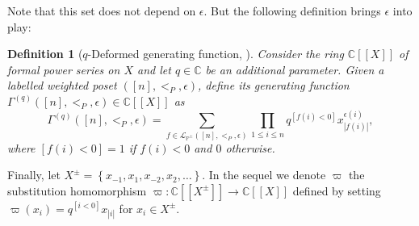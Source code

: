 \documentclass[revision]{FPSAC2024}
\newtheorem{defn}{Definition}
\newcommand{\CC}{\mathbb{C}} %
\newcommand{\PP}{\mathbb{P}} %
\begin{document}
Note that this set does not depend on $\epsilon$.
But the following definition brings $\epsilon$ into play:
\begin{defn}[$q$-Deformed generating function, \cite{GriVas22}]
Consider the ring $\CC \left[\left[ X \right]\right]$ of formal power series on $X$ and let $q \in \CC$ be an additional parameter. Given a labelled weighted poset $([n], <_P, \epsilon)$, define its generating function $\Gamma^{(q)}([n], <_P, \epsilon) \in \CC \left[\left[ X \right]\right]$ as
\begin{equation*}
\label{eq : weightGamma}
\Gamma^{(q)}([n], <_P, \epsilon) = \sum_{f\in\mathcal{L}_{\PP^\pm}([n],<_{P}, \epsilon)} \prod_{1\leq i\leq n}q^{[f(i)<0]}x_{|f(i)|}^{\epsilon(i)},
\end{equation*}
where $[f(i)<0] = 1$ if $f(i)<0$ and $0$ otherwise.
\end{defn}
Finally, let $X^\pm = \left\{x_{-1}, x_{1}, x_{-2},x_{2},\ldots\right\}$. In the sequel we denote $\varpi$ the substitution homomorphism $\varpi : \CC[[X^\pm]] \longrightarrow \CC[[X]]$ defined by setting $\varpi(x_i)=q^{[i<0]}x_{|i|}$ for $x_i \in X^\pm$.
\end{document}
